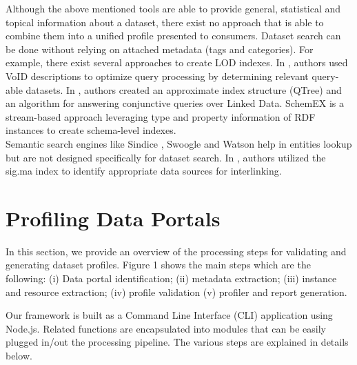 \documentclass[runningheads,a4paper]{llncs}
\begin{document}
Although the above mentioned tools are able to provide general, statistical and topical information about a dataset, there exist no approach that is able to combine them into a unified profile presented to consumers. Dataset search can be done without relying on attached metadata (tags and categories). For example, there exist several approaches to create LOD indexes. In \cite{Alexander:LDOW09}, authors used VoID descriptions to optimize query processing by determining relevant query-able datasets. In \cite{Harth:2010:DSO:1772690.1772733}, authors created an approximate index structure (QTree) and an algorithm for answering conjunctive queries over Linked Data. SchemEX \cite{Konrath:2012:SEC:2399444.2399563} is a stream-based approach leveraging type and property information of RDF instances to create schema-level indexes.\\
Semantic search engines like Sindice \cite{Delbru2010a}, Swoogle \cite{Ding2004} and Watson \cite{d'Aquin:2011:WMS:2019470.2019476} help in entities lookup but are not designed specifically for dataset search. In \cite{whatShouldILinkTo}, authors utilized the sig.ma index \cite{sig.ma} to identify appropriate data sources for interlinking.


\section{Profiling Data Portals}
\label{sec:profiling data portals}

In this section, we provide an overview of the processing steps for validating and generating dataset profiles. Figure 1 shows the main steps which are the following: (i) Data portal identification; (ii) metadata extraction; (iii) instance and resource extraction; (iv) profile validation (v) profiler and report generation.

Our framework is built as a Command Line Interface (CLI) application using Node.js. Related functions are encapsulated into modules that can be easily plugged in/out the processing pipeline. The various steps are explained in details below.
\end{document}
